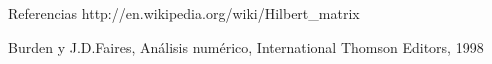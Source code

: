 \begin{section}{Referencias}
	http://en.wikipedia.org/wiki/Hilbert\_matrix
	
	Burden y J.D.Faires, Análisis numérico, International Thomson Editors, 1998
\end{section}

